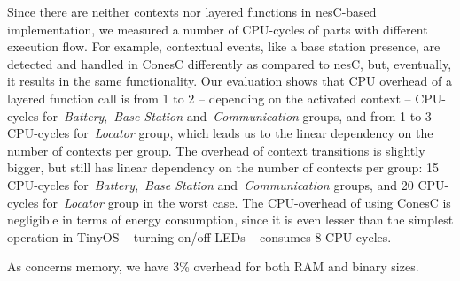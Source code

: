 Since there are neither contexts nor layered functions in nesC-based
implementation, we measured a number of CPU-cycles of parts with different
execution flow. For example, contextual events, like a base station presence,
are detected and handled in ConesC differently as compared to nesC, but,
eventually, it results in the same functionality. Our evaluation shows that CPU overhead of
a layered function call is from 1 to 2 -- depending on the activated context -- CPU-cycles
for~\emph{Battery},~\emph{Base Station} and~\emph{Communication} groups, and from
1 to 3 CPU-cycles for~\emph{Locator} group, which leads us to the linear dependency on the
number of contexts per group. The overhead of context transitions is slightly bigger, but still has
linear dependency on the number of contexts per group: 15 CPU-cycles
for~\emph{Battery},~\emph{Base Station} and~\emph{Communication} groups, and 20
CPU-cycles for~\emph{Locator} group in the worst case. The CPU-overhead of using ConesC is
negligible in terms of energy consumption, since it is even lesser than the simplest operation in
TinyOS -- turning on/off LEDs -- consumes 8 CPU-cycles.

As concerns memory, we have 3\% overhead for both RAM and binary sizes.

